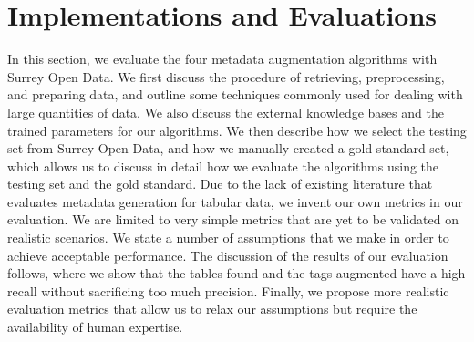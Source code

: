 
\chapter{Implementations and Evaluations}
\label{ch:Implementations}

In this section, we evaluate the four metadata augmentation algorithms with Surrey Open Data. We first discuss the procedure of retrieving, preprocessing, and preparing data, and outline some techniques commonly used for dealing with large quantities of data. We also discuss the external knowledge bases and the trained parameters for our algorithms. We then describe how we select the testing set from Surrey Open Data, and how we manually created a gold standard set, which allows us to discuss in detail how we evaluate the algorithms using the testing set and the gold standard. Due to the lack of existing literature that evaluates metadata generation for tabular data, we invent our own metrics in our evaluation. We are limited to very simple metrics that are yet to be validated on realistic scenarios. We state a number of assumptions that we make in order to achieve acceptable performance.
The discussion of the results of our evaluation follows, where we show that the tables found and the tags augmented have a high recall without sacrificing too much precision. Finally, we propose more realistic evaluation metrics that allow us to relax our assumptions but require the availability of human expertise.

